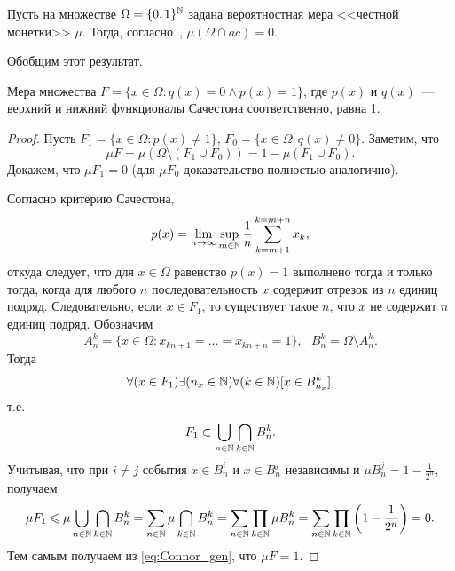 Пусть на множестве $\Omega=\{0,1\}^{\mathbb{N}}$ задана вероятностная мера <<честной монетки>> $\mu$.
Тогда, согласно~\cite{connor1990almost}, $\mu(\Omega\cap ac)=0$.

Обобщим этот результат.
\begin{theorem}
	Мера множества $F=\{x\in\Omega : q(x) = 0 \wedge p(x)= 1\}$,
	где $p(x)$ и $q(x)$~--- верхний и нижний функционалы Сачестона соответственно,
	равна 1.
\end{theorem}

\begin{proof}
	Пусть $F_1=\{x\in\Omega : p(x) \neq 1\}$, $F_0=\{x\in\Omega : q(x) \neq 0\}$.
	Заметим, что
	\begin{equation}
		\label{eq:Connor_gen}
		\mu F = \mu (\Omega\setminus(F_1 \cup F_0)) = 1 - \mu (F_1 \cup F_0)
		.
	\end{equation}
	Докажем, что $\mu F_1 = 0 $	(для $\mu F_0$  доказательство полностью аналогично).

	Согласно критерию Сачестона,
	\begin{equation}
		p(x) = \lim_{n\to\infty} \sup_{m\in\mathbb{N}} \frac{1}{n} \sum_{k=m+1}^{k=m+n} x_k
		,
	\end{equation}
	откуда следует, что
	для $x\in\Omega$ равенство $p(x) = 1$ выполнено тогда и только тогда,
	когда для любого $n$ последовательность $x$ содержит отрезок из $n$ единиц подряд.
%
	Следовательно, если $x\in F_1$,
	то существует такое $n$,
	что $x$ не содержит $n$ единиц подряд.
%
%
	Обозначим
	\begin{equation}
		A_n^k = \{x\in\Omega : x_{kn+1} = ... = x_{kn+n} = 1\}
		,
		~~~
		B_n^k = \Omega \setminus A_n^k
		.
	\end{equation}
	Тогда
	\begin{equation}
		\forall(x\in F_1)\exists(n_x\in\mathbb{N})\forall(k\in\mathbb{N})[x\in B_{n_x}^k]
		,
	\end{equation}
	т.е.
	\begin{equation}
		F_1 \subset \bigcup_{n\in\mathbb{N}} \bigcap_{k\in\mathbb{N}} B_{n}^k
		.
	\end{equation}
	Учитывая, что при $i\neq j$ события $x\in B_n^i$ и $x\in B_n^j$ независимы и $\mu B_n^j = 1-\frac{1}{2^n}$,
	получаем
	\begin{multline}
		\mu F_1 \leqslant \mu \bigcup_{n\in\mathbb{N}} \bigcap_{k\in\mathbb{N}} B_{n}^k
		=
		\sum_{n\in\mathbb{N}} \mu \bigcap_{k\in\mathbb{N}} B_{n}^k
		=
		\sum_{n\in\mathbb{N}}  \prod_{k\in\mathbb{N}} \mu B_{n}^k
		=
		\sum_{n\in\mathbb{N}}  \prod_{k\in\mathbb{N}} \left( 1-\frac{1}{2^n} \right)
		=0
		.
	\end{multline}
	Тем самым получаем из \eqref{eq:Connor_gen}, что $\mu F = 1$.
\end{proof}
